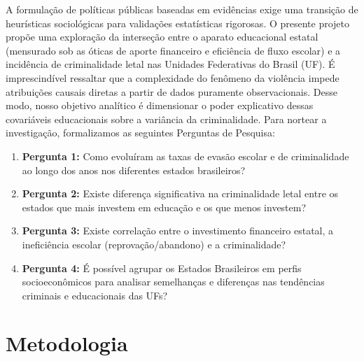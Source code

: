 \documentclass[10pt]{article}
\begin{document}
A formulação de políticas públicas baseadas em evidências exige uma transição de heurísticas sociológicas para validações estatísticas rigorosas. O presente projeto propõe uma exploração da interseção entre o aparato educacional estatal (mensurado sob as óticas de aporte financeiro e eficiência de fluxo escolar) e a incidência de criminalidade letal nas Unidades Federativas do Brasil (UF). É imprescindível ressaltar que a complexidade do fenômeno da violência impede atribuições causais diretas a partir de dados puramente observacionais. Desse modo, nosso objetivo analítico é dimensionar o poder explicativo dessas covariáveis educacionais sobre a variância da criminalidade. Para nortear a investigação, formalizamos as seguintes Perguntas de Pesquisa:
\begin{enumerate}
    \item \textbf{Pergunta 1:} Como evoluíram as taxas de evasão escolar e de criminalidade ao longo dos anos nos diferentes estados brasileiros?
    \item \textbf{Pergunta 2:} Existe diferença significativa na criminalidade letal entre os estados que mais investem em educação e os que menos investem?
    \item \textbf{Pergunta 3:} Existe correlação entre o investimento financeiro estatal, a ineficiência escolar (reprovação/abandono) e a criminalidade?
    \item \textbf{Pergunta 4:} É possível agrupar os Estados Brasileiros em perfis socioeconômicos para analisar semelhanças e diferenças nas tendências criminais e educacionais das UFs?
\end{enumerate}

\section{Metodologia}
\end{document}
